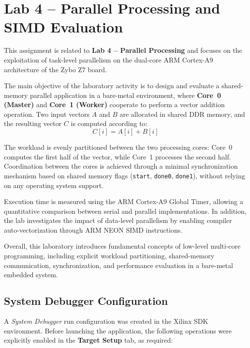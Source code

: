 \section*{Lab 4 -- Parallel Processing and SIMD Evaluation}


This assignment is related to \textbf{Lab 4 -- Parallel Processing} and focuses on the exploitation of task-level parallelism on the dual-core ARM Cortex-A9 architecture of the Zybo Z7 board.

The main objective of the laboratory activity is to design and evaluate a shared-memory parallel application in a bare-metal environment, where \textbf{Core~0 (Master)} and \textbf{Core~1 (Worker)} cooperate to perform a vector addition operation. Two input vectors $A$ and $B$ are allocated in shared DDR memory, and the resulting vector $C$ is computed according to:
\[
C[i] = A[i] + B[i]
\]

The workload is evenly partitioned between the two processing cores: Core~0 computes the first half of the vector, while Core~1 processes the second half. Coordination between the cores is achieved through a minimal synchronization mechanism based on shared memory flags (\texttt{start}, \texttt{done0}, \texttt{done1}), without relying on any operating system support.

Execution time is measured using the ARM Cortex-A9 Global Timer, allowing a quantitative comparison between serial and parallel implementations. In addition, the lab investigates the impact of data-level parallelism by enabling compiler auto-vectorization through ARM NEON SIMD instructions.

Overall, this laboratory introduces fundamental concepts of low-level multi-core programming, including explicit workload partitioning, shared-memory communication, synchronization, and performance evaluation in a bare-metal embedded system.


\subsection*{System Debugger Configuration}

A \textit{System Debugger} run configuration was created in the Xilinx SDK environment.
Before launching the application, the following operations were explicitly enabled in the
\textbf{Target Setup} tab, as required:

